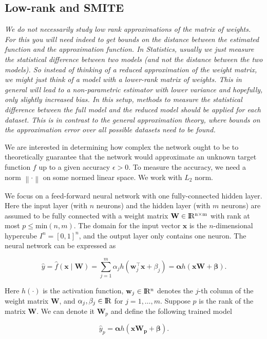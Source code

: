 \documentclass{article}
\def\x{\mathbf x}
\def \real{\rm I\!R}
\newcommand{\norm}[1]{\left\lVert#1\right\rVert}
\begin{document}
\subsection{Low-rank and SMITE}

\textit{We do not necessarily study low rank approximations of the matrix of weights. For this you will need indeed to get bounds on the distance between the estimated function and the approximation function. In Statistics, usually we just measure the statistical difference between two models (and not the distance between the two models). So instead of thinking of a reduced approximation of the weight matrix, we might just think of a model with a lower-rank matrix of weights. This in general will lead to a non-parametric estimator with lower variance and hopefully, only slightly increased bias. In this setup, methods to measure the statistical difference between the full model and the reduced model should be applied for each dataset. This is in contrast to the general approximation theory, where bounds on the approximation error over all possible datasets need to be found.}


We are interested in determining how complex the network ought to be to theoretically guarantee that the network would approximate an unknown target function $f$ up to a given accuracy $\epsilon > 0$. To measure the accuracy, we need a norm $\norm{\cdot}$ on some normed linear space. We work with $L_2$ norm.

We focus on a feed-forward neural network with one fully-connected hidden layer. Here the input layer (with $n$ neurons) and the hidden layer (with $m$ neurons) are assumed to be fully connected with a weight matrix $\mathbf W \in \real^{n \times m}$ with rank at most $p \leq \mathrm{min}(n,m)$. The domain for the input vector $\x$ is the $n$-dimensional hypercube $I^n = [0, 1]^n$, and the output layer only contains one neuron. The neural network can be expressed as 

$$\hat y = \hat f(\x\mid \mathbf  W) = \sum_{j=1}^m \alpha_j h(\mathbf w_j^\top\x + \beta_j) = \boldsymbol{\alpha} h(\x \mathbf{W} + \boldsymbol{\beta}).$$ 

Here $h(\cdot)$ is the activation function, $\mathbf w_j \in \real^n$ denotes the $j$-th column of the weight matrix $\mathbf W$, and $\alpha_j, \beta_j \in \real$ for $j = 1, \ldots, m$. Suppose $p$ is the rank of the matrix $\mathbf W$. We can denote it $\mathbf W_p$ and define the following trained model

$$\hat y_p = \boldsymbol{\alpha} h(\x \mathbf{W_p} + \boldsymbol{\beta}).$$ 
\end{document}
